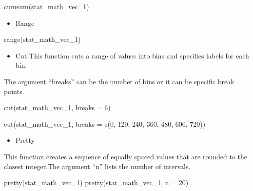 \documentclass[
  letterpaper,
  DIV=11,
  numbers=noendperiod]{scrreprt}
\newenvironment{Shaded}{}{}
\newcommand{\AttributeTok}[1]{\textcolor[rgb]{0.84,0.23,0.29}{#1}}
\newcommand{\DecValTok}[1]{\textcolor[rgb]{0.00,0.36,0.77}{#1}}
\newcommand{\FunctionTok}[1]{\textcolor[rgb]{0.44,0.26,0.76}{#1}}
\newcommand{\NormalTok}[1]{\textcolor[rgb]{0.14,0.16,0.18}{#1}}
\providecommand{\tightlist}{%
  \setlength{\itemsep}{0pt}\setlength{\parskip}{0pt}}\usepackage{longtable,booktabs,array}
\begin{document}
\begin{Shaded}
\begin{Highlighting}[]
\FunctionTok{cumsum}\NormalTok{(stat\_math\_vec\_1)}
\end{Highlighting}
\end{Shaded}

\begin{itemize}
\tightlist
\item
  Range
\end{itemize}

\begin{Shaded}
\begin{Highlighting}[]
\FunctionTok{range}\NormalTok{(stat\_math\_vec\_1)}
\end{Highlighting}
\end{Shaded}

\begin{itemize}
\tightlist
\item
  Cut This function cuts a range of values into bins and specifies
  labels for each bin.
\end{itemize}

The argument ``breaks'' can be the number of bins or it can be specific
break points.

\begin{Shaded}
\begin{Highlighting}[]
\FunctionTok{cut}\NormalTok{(stat\_math\_vec\_1, }\AttributeTok{breaks =} \DecValTok{6}\NormalTok{)}

\FunctionTok{cut}\NormalTok{(stat\_math\_vec\_1, }\AttributeTok{breaks =} \FunctionTok{c}\NormalTok{(}\DecValTok{0}\NormalTok{, }\DecValTok{120}\NormalTok{, }\DecValTok{240}\NormalTok{, }\DecValTok{360}\NormalTok{, }\DecValTok{480}\NormalTok{, }\DecValTok{600}\NormalTok{, }\DecValTok{720}\NormalTok{))}
\end{Highlighting}
\end{Shaded}

\begin{itemize}
\tightlist
\item
  Pretty
\end{itemize}

This function creates a sequence of equally spaced values that are
rounded to the closest integer.The argument ``n'' lists the number of
intervals.

\begin{Shaded}
\begin{Highlighting}[]
\FunctionTok{pretty}\NormalTok{(stat\_math\_vec\_1)}
\FunctionTok{pretty}\NormalTok{(stat\_math\_vec\_1, }\AttributeTok{n =} \DecValTok{20}\NormalTok{)}
\end{Highlighting}
\end{Shaded}
\end{document}
